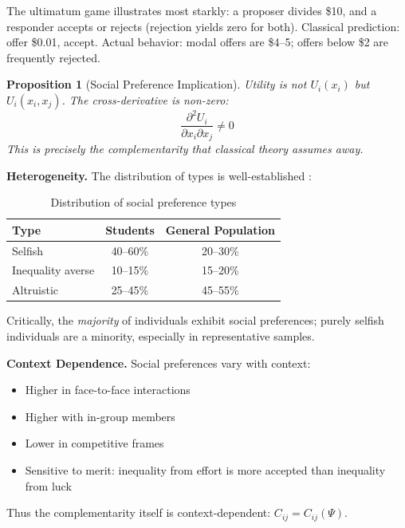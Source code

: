 \documentclass[12pt]{article}
\newtheorem{proposition}{Proposition}
\begin{document}
The ultimatum game illustrates most starkly: a proposer divides \$10, and a responder accepts or rejects (rejection yields zero for both). Classical prediction: offer \$0.01, accept. Actual behavior: modal offers are \$4--5; offers below \$2 are frequently rejected.

\begin{proposition}[Social Preference Implication]
Utility is not $U_i(x_i)$ but $U_i(x_i, x_j)$. The cross-derivative is non-zero:
\begin{equation}
\frac{\partial^2 U_i}{\partial x_i \partial x_j} \neq 0
\end{equation}
This is precisely the complementarity that classical theory assumes away.
\end{proposition}

\textbf{Heterogeneity.} The distribution of types is well-established \citep{fehrcharness2024}:

\begin{table}[h]
\centering
\begin{tabular}{lcc}
\toprule
\textbf{Type} & \textbf{Students} & \textbf{General Population} \\
\midrule
Selfish & 40--60\% & 20--30\% \\
Inequality averse & 10--15\% & 15--20\% \\
Altruistic & 25--45\% & 45--55\% \\
\bottomrule
\end{tabular}
\caption{Distribution of social preference types}
\label{tab:types}
\end{table}

Critically, the \textit{majority} of individuals exhibit social preferences; purely selfish individuals are a minority, especially in representative samples.

\textbf{Context Dependence.} Social preferences vary with context:
\begin{itemize}
    \item Higher in face-to-face interactions
    \item Higher with in-group members
    \item Lower in competitive frames
    \item Sensitive to merit: inequality from effort is more accepted than inequality from luck \citep{cappelen2007,almas2020}
\end{itemize}

Thus the complementarity itself is context-dependent: $C_{ij} = C_{ij}(\Psi)$.
\end{document}
